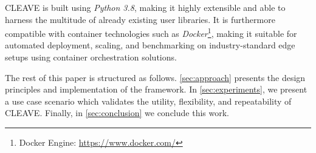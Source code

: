 \ac{CLEAVE} is built using \emph{Python 3.8}, making it highly extensible and able to harness the multitude of already existing user libraries.
It is furthermore compatible with container technologies such as \emph{Docker}\footnote{Docker Engine: \url{https://www.docker.com/}}, making it suitable for automated deployment, scaling, and benchmarking on industry-standard edge setups using container orchestration solutions.

The rest of this paper is structured as follows.
\cref{sec:approach} presents the design principles and implementation of the framework.
In \cref{sec:experiments}, we present a use case scenario which validates the utility, flexibility, and repeatability of \ac{CLEAVE}.
Finally, in \cref{sec:conclusion} we conclude this work.